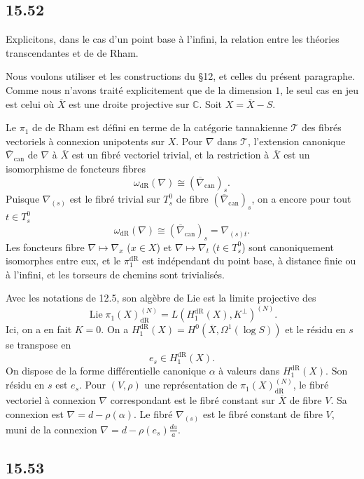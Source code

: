 \documentclass[12pt,a4paper]{article}
\theoremstyle{plain}
\theoremstyle{definition}
\theoremstyle{remark}
\DeclareMathOperator{\Lie}{Lie}
\newcommand{\bC}{\mathbb{C}}
\newcommand{\dr}{\mathrm{dR}}
\begin{document}
\subsection*{15.52}

Explicitons, dans le cas d'un point base à l'infini, la relation entre les théories transcendantes et de de Rham.

Nous voulons utiliser et les constructions du §12, et celles du présent paragraphe. Comme nous n'avons traité explicitement que de la dimension $1$, le seul cas en jeu est celui où $\overline{X}$ est une droite projective sur $\bC$. Soit $X = \overline{X} - S$.

Le $\pi_1$ de de Rham est défini en terme de la catégorie tannakienne $\mathcal{T}$ des fibrés vectoriels à connexion unipotents sur $X$. Pour $\nabla$ dans $\mathcal{T}$, l'extension canonique $\overline{\nabla}_{\text{can}}$ de $\nabla$ à $\overline{X}$ est un fibré vectoriel trivial, et la restriction à $\overline{X}$ est un isomorphisme de foncteurs fibres
\[
\omega_{\dr}(\nabla) \cong (\overline{\nabla}_{\text{can}})_s.
\]
Puisque $\nabla_{(s)}$ est le fibré trivial sur $T_s^0$ de fibre $(\overline{\nabla}_{\text{can}})_s$, on a encore pour tout $t \in T_s^0$
\[
\omega_{\dr}(\nabla) \cong (\overline{\nabla}_{\text{can}})_s = \nabla_{(s)t}.
\]
Les foncteurs fibre $\nabla \mapsto \nabla_x$ ($x \in X$) et $\nabla \mapsto \nabla_t$ ($t \in T_s^0$) sont canoniquement isomorphes entre eux, et le $\pi_1^{\dr}$ est indépendant du point base, à distance finie ou à l'infini, et les torseurs de chemins sont trivialisés.

Avec les notations de 12.5, son algèbre de Lie est la limite projective des
\[
\Lie \pi_1(X)_{\dr}^{(N)} = L(H_1^{\dr}(X), K^\perp)^{(N)}.
\]
Ici, on a en fait $K = 0$. On a $H_{1}^{\dr}(X) = H^0(\overline{X}, \Omega^1(\log S))$ et le résidu en $s$ se transpose en
\[
e_s \in H_{1}^{\dr}(X).
\]
On dispose de la forme différentielle canonique $\alpha$ à valeurs dans $H_1^{\dr}(X)$. Son résidu en $s$ est $e_s$. Pour $(V, \rho)$ une représentation de $\pi_1(X)_{\dr}^{(N)}$, le fibré vectoriel à connexion $\nabla$ correspondant est le fibré constant sur $\overline{X}$ de fibre $V$. Sa connexion est $\nabla = d - \rho(\alpha)$. Le fibré $\nabla_{(s)}$ est le fibré constant de fibre $V$, muni de la connexion $\nabla = d - \rho(e_s) \frac{da}{a}$.

\subsection*{15.53}
\end{document}
